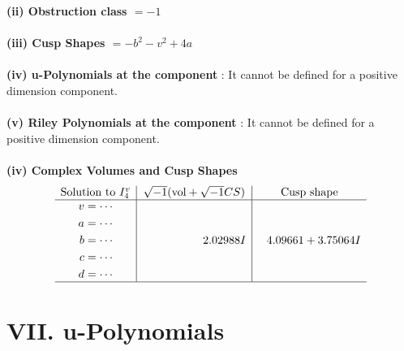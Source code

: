 \documentclass[1p]{elsarticle_modified}
\theoremstyle{definition}
\newcommand{\I}{\sqrt{-1}}
\begin{document}
\flushleft \textbf{(ii) Obstruction class $= -1$}\\~\\
\flushleft \textbf{(iii) Cusp Shapes $= - b^2- v^2+4 a$}\\~\\
\flushleft \textbf{(iv) u-Polynomials at the component} : It cannot be defined for a positive dimension component.\\~\\
\flushleft \textbf{(v) Riley Polynomials at the component} : It cannot be defined for a positive dimension component.\\~\\
\newpage\flushleft \textbf{(iv) Complex Volumes and Cusp Shapes}
$$\begin{array}{c|c|c} 
\text{Solution to }I^v_{4}& \I (\text{vol} + \sqrt{-1}CS) & \text{Cusp shape}\\
 \hline 
\begin{aligned}
v &= \cdots \\
a &= \cdots \\
b &= \cdots \\
c &= \cdots \\
d &= \cdots\end{aligned}
 & \phantom{-0.000000 -}2.02988 I & \phantom{-}4.09661 + 3.75064 I\\
 \hline 
 \end{array}
$$
\newpage\renewcommand{\arraystretch}{1}
\centering \section*{ VII. u-Polynomials}
\end{document}
